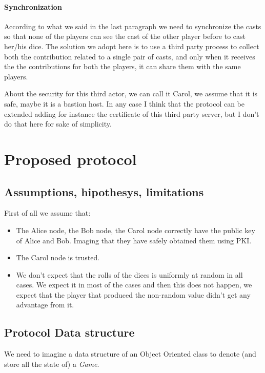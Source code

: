 \documentclass{article}
\begin{document}
\paragraph{Synchronization}
	
According to what we said in the last paragraph we need to synchronize
the casts so that none of the players can see the cast of the other player
before to cast her/his dice.
The solution we adopt here is to use a third party process to collect
both the contribution related to a single pair of casts, and only
when it receives the the contributions for both the players,
it can share them with the same players.

About the security for this third actor, we can call it Carol, we assume that
it is safe, maybe it is a bastion host. In any case I think that the protocol
can be extended adding for instance the certificate of this third
party server, but I don't do that here for sake of simplicity.

\section{Proposed protocol}

\subsection{Assumptions, hipothesys, limitations}

First of all we assume that:
\begin{itemize}
	\item The Alice node, the Bob node, the Carol node correctly have the public key of Alice and Bob.
	Imaging that they have safely obtained them using PKI.
	\item The Carol node is trusted.
	\item We don't expect that the rolls of the dices is uniformly at random in all cases.
	We expect it in most of the cases and then this does not happen, we expect that
	the player that produced the non-random value didn't get any advantage from it.
\end{itemize}	

\subsection{Protocol Data structure}

We need to imagine a data structure of an Object Oriented class to
denote (and store all the state of) a \emph{Game}.
\end{document}
